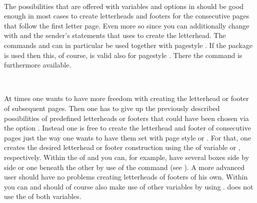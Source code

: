 \begin{Declaration}
  \\
\end{Declaration}
%
%
The possibilities that are offered with variables and options in
 should be good enough in most cases to create letterheads and
footers for the consecutive pages that follow the first letter page. Even more
so since you can additionally change with  and
 the sender's statements that  uses to create
the letterhead. The commands  and
 can in particular be used together with
pagestyle %
. If the package
 is used then this,
of course, is valid also for pagestyle
. There the command
 is furthermore available.

\begin{Declaration}
    \\
\end{Declaration}
%
%
At times one wants to have more freedom with creating the letterhead or footer
of subsequent pages. Then one has to give up the previously described
possibilities of predefined letterheads or footers that could have been chosen
via the option . Instead one is
free to create the letterhead and footer of consecutive pages just the way one
wants to have them set with page style
 or
.  For that, one creates the
desired letterhead or footer construction using the  of
variable  or
, respectively. Within the  of
 and  you can, for example, have several
boxes side by side or one beneath the other by use of the 
command (see \cite{latex:usrguide}). A more advanced user should have no
problems creating letterheads of footers of his own.  Within 
you can and should of course also make use of other variables by using
. \KOMAScript{} does not use the  of both
variables.

